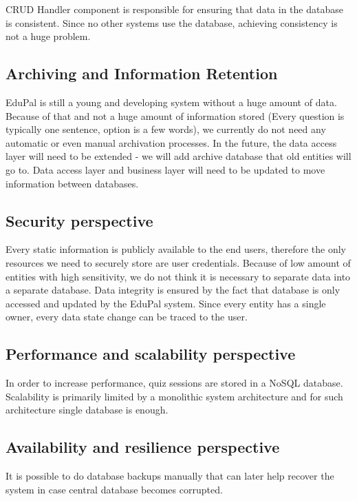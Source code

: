 CRUD Handler component is responsible for ensuring that data in the database is consistent. Since no other systems use the database, achieving consistency is not a huge problem.

\subsection{Archiving and Information Retention}

EduPal is still a young and developing system without a huge amount of data. Because of that and not a huge amount of information stored (Every question is typically one sentence, option is a few words), we currently do not need any automatic or even manual archivation processes. In the future, the data access layer will need to be extended - we will add archive database that old entities will go to. Data access layer and business layer will need to be updated to move information between databases.

\subsection{Security perspective}

Every static information is publicly available to the end users, therefore the only resources we need to securely store are user credentials. Because of low amount of entities with high sensitivity, we do not think it is necessary to separate data into a separate database. Data integrity is ensured by the fact that database is only accessed and updated by the EduPal system. Since every entity has a single owner, every data state change can be traced to the user.

\subsection{Performance and scalability perspective}

In order to increase performance, quiz sessions are stored in a NoSQL database. Scalability is primarily limited by a monolithic system architecture and for such architecture single database is enough.

\subsection{Availability and resilience perspective}

It is possible to do database backups manually that can later help recover the system in case central database becomes corrupted.

